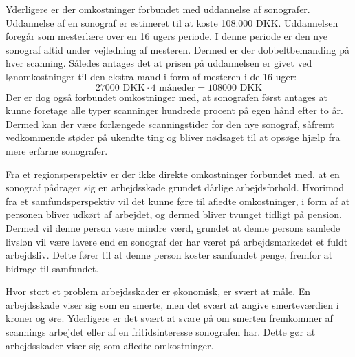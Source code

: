 Yderligere er der omkostninger forbundet med uddannelse af sonografer. Uddannelse af en sonograf er estimeret til at koste 108.000 DKK. Uddannelsen foregår som mesterlære over en 16 ugers periode. I denne periode er den nye sonograf altid under vejledning af mesteren. Dermed er der dobbeltbemanding på hver scanning. Således antages det at prisen på uddannelsen er givet ved lønomkostninger til den ekstra mand i form af mesteren i de 16 uger:
\begin{equation}
27000 \text{ DKK}\cdot4 \text{ måneder} = 108000 \text{ DKK}
\end{equation}
Der er dog også forbundet omkostninger med, at sonografen først antages at kunne foretage alle typer scanninger hundrede procent på egen hånd efter to år. Dermed kan der være forlængede scanningstider for den nye sonograf, såfremt vedkommende støder på ukendte ting og bliver nødsaget til at opsøge hjælp fra mere erfarne sonografer. 

Fra et regionsperspektiv er der ikke direkte omkostninger forbundet med, at en sonograf pådrager sig en arbejdsskade grundet dårlige arbejdsforhold. Hvorimod fra et samfundsperspektiv vil det kunne føre til afledte omkostninger, i form af at personen bliver udkørt af arbejdet, og dermed bliver tvunget tidligt på pension. Dermed vil denne person være mindre værd, grundet at denne persons samlede livsløn vil være lavere end en sonograf der har været på arbejdsmarkedet et fuldt arbejdsliv. Dette fører til at denne person koster samfundet penge, fremfor at bidrage til samfundet. 

Hvor stort et problem arbejdsskader er økonomisk, er svært at måle. En arbejdsskade viser sig som en smerte, men det svært at angive smerteværdien i kroner og øre. Yderligere er det svært at svare på om smerten fremkommer af scannings arbejdet eller af en fritidsinteresse sonografen har. Dette gør at arbejdsskader viser sig som afledte omkostninger.

